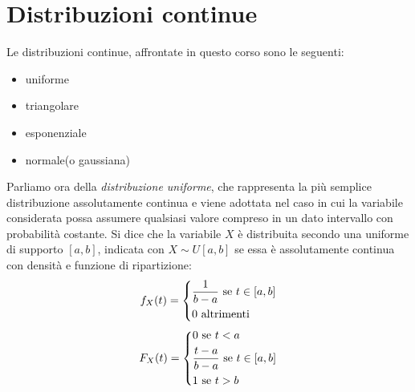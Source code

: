 \documentclass[a4paper,12pt, oneside]{book}
\begin{document}
\section{Distribuzioni continue}
Le distribuzioni continue, affrontate in questo corso sono le seguenti:
\begin{itemize}
    \item uniforme
    \item triangolare
    \item esponenziale
    \item normale(o gaussiana)
\end{itemize}
Parliamo ora della \emph{distribuzione uniforme}, che rappresenta la più semplice distribuzione assolutamente continua
e viene adottata nel caso in cui la variabile considerata possa assumere qualsiasi valore compreso
in un dato intervallo con probabilità costante.\newline
Si dice che la variabile $X$ è distribuita secondo una uniforme di supporto $[a,b]$, indicata con $X \sim U[a, b]$
se essa è assolutamente continua con densità e funzione di ripartizione:
\[f_X(t) = \begin{dcases}
            \frac{1}{b-a} \mbox{ se } t \in [a,b]\\
            0             \mbox{ altrimenti}\\
           \end{dcases}\]
\[F_X(t) = \begin{dcases}
            0 \mbox{ se } t < a\\
            \frac{t-a}{b-a} \mbox{ se } t \in [a,b]\\
            1 \mbox{ se } t > b\\
            \end{dcases}\]
            
\end{document}
